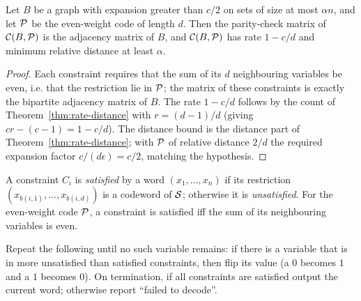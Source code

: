 \begin{proposition}
  \label{prop:parity-example}
  Let $B$ be a graph with expansion greater than $c/2$ on sets of size at most
  $\alpha n$, and let $\mathcal{P}$ be the even-weight code of length $d$. Then the
  parity-check matrix of $\mathcal{C}(B,\mathcal{P})$ is the adjacency matrix of $B$, and
  $\mathcal{C}(B,\mathcal{P})$ has rate $1-c/d$ and minimum relative distance at least
  $\alpha$.
\end{proposition}
\begin{proof}
  Each constraint requires that the sum of its $d$ neighbouring variables be
  even, i.e. that the restriction lie in $\mathcal{P}$; the matrix of these constraints
  is exactly the bipartite adjacency matrix of $B$. The rate $1-c/d$ follows by
  the count of Theorem~\ref{thm:rate-distance} with $r=(d-1)/d$ (giving
  $cr-(c-1)=1-c/d$). The distance bound is the distance part of
  Theorem~\ref{thm:rate-distance}; with $\mathcal{P}$ of relative distance $2/d$ the
  required expansion factor $c/(d\epsilon)=c/2$, matching the hypothesis.
\end{proof}

\begin{definition}
  \label{def:satisfied}
  A constraint $C_i$ is \emph{satisfied} by a word $(x_1,\dots,x_n)$ if its
  restriction $(x_{b(i,1)},\dots,x_{b(i,d)})$ is a codeword of $\mathcal{S}$; otherwise
  it is \emph{unsatisfied}. For the even-weight code $\mathcal{P}$, a constraint is
  satisfied iff the sum of its neighbouring variables is even.
\end{definition}

\begin{definition}
  \label{def:seq-decode}
  Repeat the following until no such variable remains: if there is a variable
  that is in more unsatisfied than satisfied constraints, then flip its value
  (a $0$ becomes $1$ and a $1$ becomes $0$). On termination, if all constraints
  are satisfied output the current word; otherwise report ``failed to decode''.
\end{definition}

